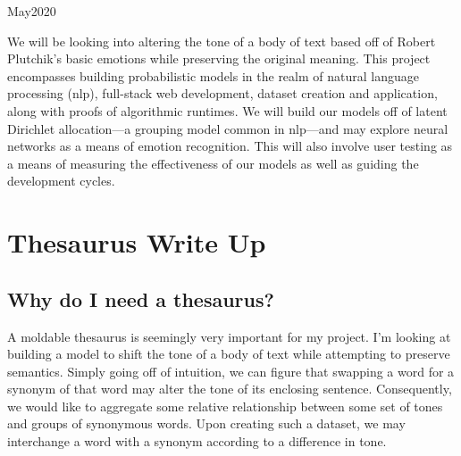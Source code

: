 \documentclass[11pt, twoside, reqno]{book}
\begin{document}
    {May}{2020}

\abstr
We will be looking into altering the tone of a body of text based off of Robert Plutchik's basic emotions while preserving the original meaning. This project encompasses building probabilistic models in the realm of natural language processing (nlp), full-stack web development, dataset creation and application, along with proofs of algorithmic runtimes. We will build our models off of latent Dirichlet allocation—a grouping model common in nlp—and may explore neural networks as a means of emotion recognition. This will also involve user testing as a means of measuring the effectiveness of our models as well as guiding the development cycles.

\tableofcontents





\startmain



\chapter{Thesaurus Write Up}


\section{Why do I need a thesaurus?}

A moldable thesaurus is seemingly very important for my project. I'm looking at building a model to shift the tone of a body of text while attempting to preserve semantics. Simply going off of intuition, we can figure that swapping a word for a synonym of that word may alter the tone of its enclosing sentence. Consequently, we would like to aggregate some relative relationship between some set of tones and groups of synonymous words. Upon creating such a dataset, we may interchange a word with a synonym according to a difference in tone.
\end{document}

